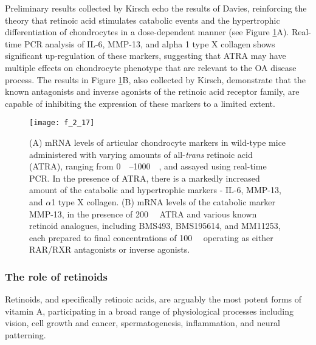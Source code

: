 \begin{refsection}
Preliminary results collected by Kirsch echo the results of Davies, reinforcing
the theory that retinoic acid stimulates catabolic events and the hypertrophic
differentiation of chondrocytes in a dose-dependent manner (see Figure
\ref{fig:kirsch_prelim_results}A). Real-time PCR analysis of IL-6, MMP-13, and
alpha 1 type X collagen shows significant up-regulation of these markers,
suggesting that ATRA may have multiple effects on chondrocyte phenotype that are
relevant to the OA disease process. The results in Figure
\ref{fig:kirsch_prelim_results}B, also collected by Kirsch, demonstrate that the
known antagonists and inverse agonists of the retinoic acid receptor
family,\cite{DeLera2007} are capable of inhibiting the expression of these
markers to a limited extent.

\begin{figure}[h!] \centering \texttt{[image: f\_2\_17]}
    \caption{(A) mRNA levels of articular chondrocyte markers in wild-type mice
    administered with varying amounts of all-\emph{trans} retinoic acid (ATRA),
    ranging from \SIrange{0}{1000}{\nano\moLar}, and assayed using real-time
    PCR. In the presence of ATRA, there is a markedly increased amount of the
    catabolic and hypertrophic markers - IL-6, MMP-13, and ${\alpha}$1 type X
    collagen. (B) mRNA levels of the catabolic marker MMP-13, in the presence of
    \SI{200}{\nano\moLar} ATRA and various known retinoid analogues, including
    BMS493, BMS195614, and MM11253, each prepared to final concentrations of
    \SI{100}{\nano\moLar} operating as either RAR/RXR antagonists or inverse
    agonists.}
    \label{fig:kirsch_prelim_results} \end{figure}

\subsubsection{The role of retinoids}

Retinoids, and specifically retinoic acids, are arguably the most potent forms
of vitamin A, participating in a broad range of physiological processes
including vision,\cite{Hyatt1996} cell growth and cancer,\cite{Mongan2007}
spermatogenesis,\cite{Vernet2006} inflammation,\cite{Huang2007} and
neural patterning.\cite{Abu-Abed2001}


\end{refsection}
